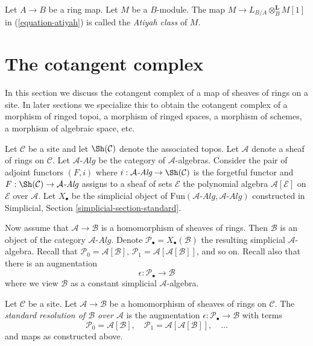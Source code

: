 \begin{definition}
\label{definition-atiyah-class}
Let $A \to B$ be a ring map. Let $M$ be a $B$-module.
The map $M \to L_{B/A} \otimes_B^\mathbf{L} M[1]$
in (\ref{equation-atiyah}) is called the {\it Atiyah class} of $M$.
\end{definition}




\section{The cotangent complex}
\label{section-cotangent-complex}

\noindent
In this section we discuss the cotangent complex of a map of sheaves
of rings on a site. In later sections we specialize this to obtain
the cotangent complex of a morphism of ringed topoi, a morphism of
ringed spaces, a morphism of schemes, a morphism of algebraic space, etc.

\medskip\noindent
Let $\mathcal{C}$ be a site and let $\Sh(\mathcal{C})$ denote the
associated topos. Let $\mathcal{A}$ denote a sheaf of rings
on $\mathcal{C}$. Let $\mathcal{A}\textit{-Alg}$ be the category of
$\mathcal{A}$-algebras. Consider the pair of adjoint functors $(F, i)$ where
$i : \mathcal{A}\textit{-Alg} \to \Sh(\mathcal{C})$ is the forgetful functor and
$F : \Sh(\mathcal{C}) \to \mathcal{A}\textit{-Alg}$ assigns to a sheaf of sets
$\mathcal{E}$ the polynomial algebra $\mathcal{A}[\mathcal{E}]$ on
$\mathcal{E}$ over $\mathcal{A}$.
Let $X_\bullet$ be the simplicial object of
$\text{Fun}(\mathcal{A}\textit{-Alg}, \mathcal{A}\textit{-Alg})$
constructed in
Simplicial, Section \ref{simplicial-section-standard}.

\medskip\noindent
Now assume that $\mathcal{A} \to \mathcal{B}$ is a homomorphism of sheaves
of rings. Then $\mathcal{B}$ is an object of the category
$\mathcal{A}\textit{-Alg}$. Denote
$\mathcal{P}_\bullet = X_\bullet(\mathcal{B})$ the resulting
simplicial $\mathcal{A}$-algebra.
Recall that
$\mathcal{P}_0 = \mathcal{A}[\mathcal{B}]$,
$\mathcal{P}_1 = \mathcal{A}[\mathcal{A}[\mathcal{B}]]$, and so on.
Recall also that there is an augmentation
$$
\epsilon : \mathcal{P}_\bullet \longrightarrow \mathcal{B}
$$
where we view $\mathcal{B}$ as a constant simplicial $\mathcal{A}$-algebra.

\begin{definition}
\label{definition-standard-resolution-sheaves-rings}
Let $\mathcal{C}$ be a site.
Let $\mathcal{A} \to \mathcal{B}$ be a homomorphism of sheaves of rings
on $\mathcal{C}$. The {\it standard resolution of $\mathcal{B}$ over
$\mathcal{A}$} is the augmentation
$\epsilon : \mathcal{P}_\bullet \to \mathcal{B}$
with terms
$$
\mathcal{P}_0 = \mathcal{A}[\mathcal{B}],\quad
\mathcal{P}_1 = \mathcal{A}[\mathcal{A}[\mathcal{B}]],\quad \ldots
$$
and maps as constructed above.
\end{definition}

